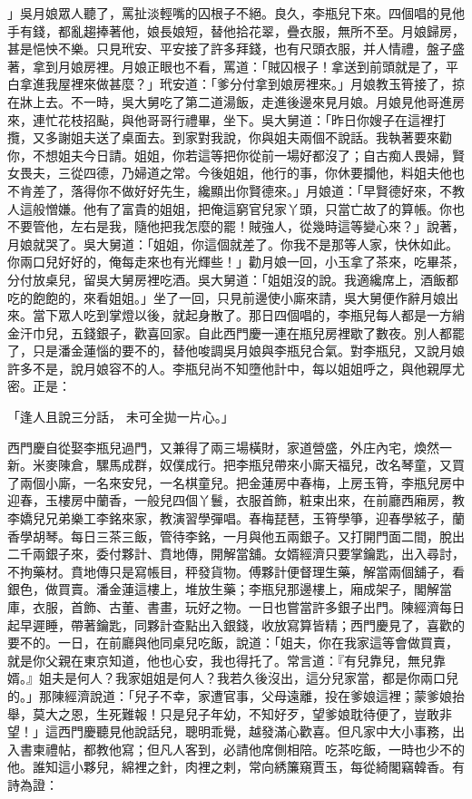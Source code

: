 」吳月娘眾人聽了，罵扯淡輕嘴的囚根子不絕。良久，李瓶兒下來。四個唱的見他手有錢，都亂趨捧著他，娘長娘短，替他拾花翠，疊衣服，無所不至。月娘歸房，甚是悒怏不樂。只見玳安、平安接了許多拜錢，也有尺頭衣服，并人情禮，盤子盛著，拿到月娘房裡。月娘正眼也不看，罵道：「賊囚根子！拿送到前頭就是了，平白拿進我屋裡來做甚麼？」玳安道：「爹分付拿到娘房裡來。」月娘教玉筲接了，掠在牀上去。不一時，吳大舅吃了第二道湯飯，走進後邊來見月娘。月娘見他哥進房來，連忙花枝招颭，與他哥哥行禮畢，坐下。吳大舅道：「昨日你嫂子在這裡打攬，又多謝姐夫送了桌面去。到家對我說，你與姐夫兩個不說話。我執著要來勸你，不想姐夫今日請。姐姐，你若這等把你從前一場好都沒了；自古痴人畏婦，賢女畏夫，三從四德，乃婦道之常。今後姐姐，他行的事，你休要攔他，料姐夫他也不肯差了，落得你不做好好先生，纔顯出你賢德來。」月娘道：「早賢德好來，不教人這般憎嫌。他有了富貴的姐姐，把俺這窮官兒家丫頭，只當亡故了的算帳。你也不要管他，左右是我，隨他把我怎麼的罷！賊強人，從幾時這等變心來？」說著，月娘就哭了。吳大舅道：「姐姐，你這個就差了。你我不是那等人家，快休如此。你兩口兒好好的，俺每走來也有光輝些！」勸月娘一回，小玉拿了茶來，吃畢茶，分付放桌兒，留吳大舅房裡吃酒。吳大舅道：「姐姐沒的說。我適纔席上，酒飯都吃的飽飽的，來看姐姐。」坐了一回，只見前邊使小廝來請，吳大舅便作辭月娘出來。當下眾人吃到掌燈以後，就起身散了。那日四個唱的，李瓶兒每人都是一方綃金汗巾兒，五錢銀子，歡喜回家。自此西門慶一連在瓶兒房裡歇了數夜。別人都罷了，只是潘金蓮惱的要不的，替他唆調吳月娘與李瓶兒合氣。對李瓶兒，又說月娘許多不是，說月娘容不的人。李瓶兒尚不知墮他計中，每以姐姐呼之，與他親厚尤密。正是：

「逢人且說三分話，  未可全拋一片心。」

西門慶自從娶李瓶兒過門，又兼得了兩三場橫財，家道營盛，外庄內宅，煥然一新。米麥陳倉，騾馬成群，奴僕成行。把李瓶兒帶來小廝天福兒，改名琴童，又買了兩個小廝，一名來安兒，一名棋童兒。把金蓮房中春梅，上房玉筲，李瓶兒房中迎春，玉樓房中蘭香，一般兒四個丫鬟，衣服首飾，粧束出來，在前廳西廂房，教李嬌兒兄弟樂工李銘來家，教演習學彈唱。春梅琵琶，玉筲學箏，迎春學絃子，蘭香學胡琴。每日三茶三飯，管待李銘，一月與他五兩銀子。又打開門面二間，脫出二千兩銀子來，委付夥計、賁地傳，開解當舖。女婿經濟只要掌鑰匙，出入尋討，不拘藥材。賁地傳只是寫帳目，秤發貨物。傅夥計便督理生藥，解當兩個舖子，看銀色，做買賣。潘金蓮這樓上，堆放生藥；李瓶兒那邊樓上，廂成架子，閣解當庫，衣服，首飾、古董、書畫，玩好之物。一日也嘗當許多銀子出門。陳經濟每日起早遲睡，帶著鑰匙，同夥計查點出入銀錢，收放寫算皆精；西門慶見了，喜歡的要不的。一日，在前廳與他同桌兒吃飯，說道：「姐夫，你在我家這等會做買賣，就是你父親在東京知道，他也心安，我也得托了。常言道：『有兒靠兒，無兒靠婿。』姐夫是何人？我家姐姐是何人？我若久後沒出，這分兒家當，都是你兩口兒的。」那陳經濟說道：「兒子不幸，家遭官事，父母遠離，投在爹娘這裡；蒙爹娘抬舉，莫大之恩，生死難報！只是兒子年幼，不知好歹，望爹娘耽待便了，豈敢非望！」這西門慶聽見他說話兒，聰明乖覺，越發滿心歡喜。但凡家中大小事務，出入書柬禮帖，都教他寫；但凡人客到，必請他席側相陪。吃茶吃飯，一時也少不的他。誰知這小夥兒，綿裡之針，肉裡之剌，常向綉簾窺賈玉，每從綺閣竊韓香。有詩為證：

